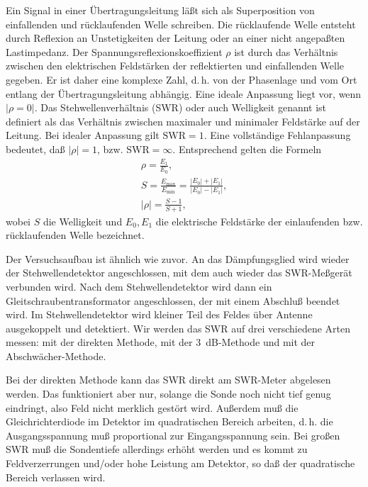 Ein Signal in einer Übertragungsleitung läßt sich als Superposition von
einfallenden und rücklaufenden Welle schreiben.  Die rücklaufende Welle
entsteht durch Reflexion an Unstetigkeiten der Leitung oder an einer
nicht angepaßten Lastimpedanz. Der Spannungsreflexionskoeffizient $\rho$
ist durch das Verhältnis zwischen den elektrischen Feldstärken der
reflektierten und einfallenden Welle gegeben. Er ist daher eine komplexe
Zahl, d.\,h. von der Phasenlage und vom Ort entlang der
Übertragungsleitung abhängig.  Eine ideale Anpassung liegt vor, wenn
$|\rho = 0|$.  Das Stehwellenverhältnis (SWR) oder auch Welligkeit
genannt ist definiert als das Verhältnis zwischen maximaler und
minimaler Feldstärke auf der Leitung.  Bei idealer Anpassung gilt
$\text{SWR} = 1$.  Eine vollständige Fehlanpassung bedeutet, daß $|\rho|
= 1$, bzw. $\text{SWR} = \infty$.  Entsprechend gelten die Formeln
%
\begin{gather}
  \rho = \frac{E_1}{E_0},\\
  S = \frac{E_\text{max}}{E_\text{min}} = \frac{|E_0| + |E_1|}{|E_0| -
    |E_1|},\\
  |\rho| = \frac{S-1}{S+1},
\end{gather}
%
wobei $S$ die Welligkeit und $E_0,E_1$ die elektrische Feldstärke der
einlaufenden bzw. rücklaufenden Welle bezeichnet.

Der Versuchsaufbau ist ähnlich wie zuvor.  An das Dämpfungsglied wird
wieder der Stehwellendetektor angeschlossen, mit dem auch wieder das
SWR-Meßgerät verbunden wird.  Nach dem Stehwellendetektor wird dann ein
Gleitschraubentransformator angeschlossen, der mit einem Abschluß
beendet wird. Im Stehwellendetektor wird kleiner Teil des Feldes über
Antenne ausgekoppelt und detektiert.  Wir werden das SWR auf drei
verschiedene Arten messen: mit der direkten Methode, mit der
\SI{3}{dB}-Methode und mit der Abschwächer-Methode.

Bei der direkten Methode kann das SWR direkt am SWR-Meter abgelesen
werden. Das funktioniert aber nur, solange die Sonde noch nicht tief
genug eindringt, also Feld nicht merklich gestört wird.  Außerdem muß
die Gleichrichterdiode im Detektor im quadratischen Bereich arbeiten,
d.\,h. die Ausgangsspannung muß proportional zur Eingangsspannung
sein. Bei großen SWR muß die Sondentiefe allerdings erhöht werden und es
kommt zu Feldverzerrungen und/oder hohe Leistung am Detektor, so daß der
quadratische Bereich verlassen wird.

